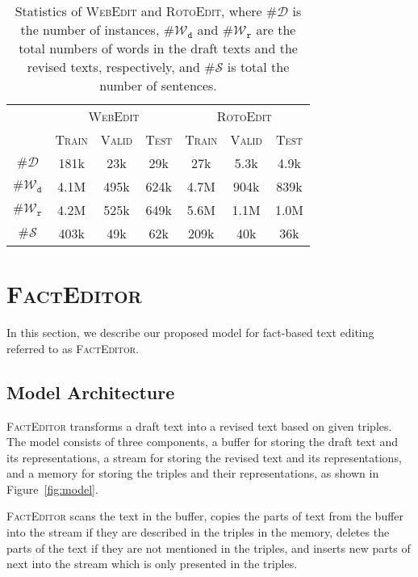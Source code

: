 \documentclass[11pt,a4paper]{article}
\begin{document}
\begin{table}[t]
    \centering
    \footnotesize
    \begin{tabular}{@{}c|cccccc@{}}
        \toprule
         & \multicolumn{3}{c}{\textsc{WebEdit}} & \multicolumn{3}{c}{\textsc{RotoEdit}}\\
         & \textsc{\scriptsize{Train}} & \textsc{\scriptsize{Valid}} & \textsc{\scriptsize{Test}}& \textsc{\scriptsize{Train}} & \textsc{\scriptsize{Valid}} & \textsc{\scriptsize{Test}}\\
          \midrule
        $\#\mathcal{D}$ & 181k & 23k & 29k & 27k & 5.3k & 4.9k\\
        $\#\mathcal{W}_\texttt{d}$ & 4.1M & 495k & 624k & 4.7M & 904k & 839k\\
        $\#\mathcal{W}_\texttt{r}$ & 4.2M & 525k & 649k & 5.6M & 1.1M & 1.0M\\
        $\#\mathcal{S}$ & 403k & 49k & 62k & 209k  & 40k  & 36k \\
        \bottomrule
    \end{tabular}
    \caption{Statistics of \textsc{WebEdit} and \textsc{RotoEdit}, where \#$\mathcal{D}$ is the number of instances, \#$\mathcal{W}_\texttt{d}$ and \#$\mathcal{W}_\texttt{r}$ are the total numbers of words in the draft texts and the revised texts, respectively, and \#$\mathcal{S}$ is total the number of sentences.}
    \label{tab:stats}
\end{table}

\section{\textsc{FactEditor}}
\label{sec:model}
In this section, we describe our proposed model for fact-based text editing referred to as \textsc{FactEditor}.

\subsection{Model Architecture}

\textsc{FactEditor} transforms a draft text into a revised text based on given triples. The model consists of three components, a buffer for storing the draft text and its representations, a stream for storing the revised text and its representations, and a memory for storing the triples and their representations, as shown in Figure~\ref{fig:model}.

\textsc{FactEditor} scans the text in the buffer, copies the parts of text from the buffer into the stream if they are described in the triples in the memory, deletes the parts of the text if they are not mentioned in the triples, and inserts new parts of next into the stream which is only presented in the triples.
\end{document}
